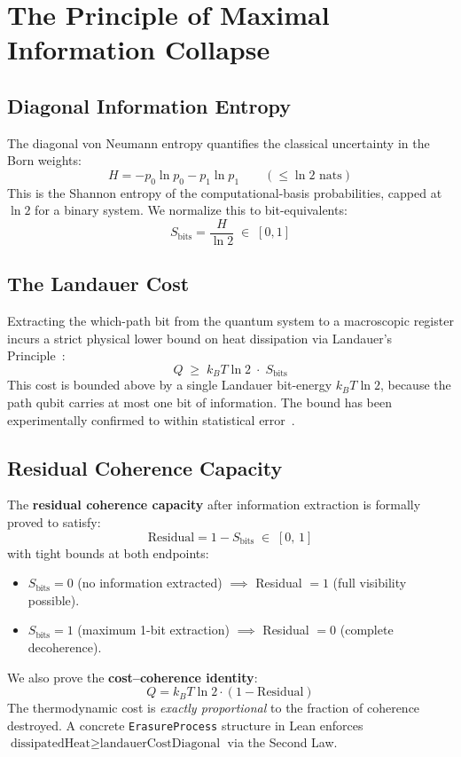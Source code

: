 \documentclass[11pt, a4paper]{article}
\begin{document}
\section{The Principle of Maximal Information Collapse}

\subsection{Diagonal Information Entropy}

The diagonal von Neumann entropy quantifies the classical uncertainty in the Born weights:
\[
H = -p_0 \ln p_0 - p_1 \ln p_1 \qquad (\le \ln 2 \text{ nats})
\]
This is the Shannon entropy of the computational-basis probabilities, capped at $\ln 2$ for a binary system. We normalize this to bit-equivalents:
\[
S_{\text{bits}} = \frac{H}{\ln 2} \;\in\; [0, 1]
\]

\subsection{The Landauer Cost}

Extracting the which-path bit from the quantum system to a macroscopic register incurs a strict physical lower bound on heat dissipation via Landauer's Principle~\cite{landauer1961}:
\[
Q \;\ge\; k_B T \ln 2 \;\cdot\; S_{\text{bits}}
\]
This cost is bounded above by a single Landauer bit-energy $k_B T \ln 2$, because the path qubit carries at most one bit of information. The bound has been experimentally confirmed to within statistical error~\cite{berut2012}.

\subsection{Residual Coherence Capacity}

The \textbf{residual coherence capacity} after information extraction is formally proved to satisfy:
\[
\text{Residual} = 1 - S_{\text{bits}} \;\in\; [0,\,1]
\]
with tight bounds at both endpoints:
\begin{itemize}
\item $S_{\text{bits}} = 0$ (no information extracted) $\implies$ Residual $= 1$ (full visibility possible).
\item $S_{\text{bits}} = 1$ (maximum 1-bit extraction) $\implies$ Residual $= 0$ (complete decoherence).
\end{itemize}

We also prove the \textbf{cost--coherence identity}:
\[
Q = k_B T \ln 2 \cdot (1 - \text{Residual})
\]
The thermodynamic cost is \emph{exactly proportional} to the fraction of coherence destroyed. A concrete \texttt{ErasureProcess} structure in Lean enforces $\text{dissipatedHeat} \ge \text{landauerCostDiagonal}$ via the Second Law.
\end{document}
